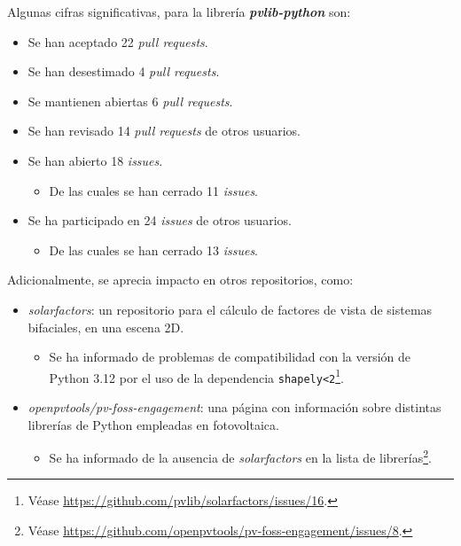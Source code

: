 Algunas cifras significativas, para la librería \textbf{\textit{pvlib-python}} son:

\begin{itemize}
    \item Se han aceptado 22 \textit{pull requests}.
    \item Se han desestimado 4 \textit{pull requests}.
    \item Se mantienen abiertas 6 \textit{pull requests}.
    \item Se han revisado 14 \textit{pull requests} de otros usuarios.
    \item Se han abierto 18 \textit{issues}.
    \begin{itemize}
        \item De las cuales se han cerrado 11 \textit{issues}.
    \end{itemize}
    \item Se ha participado en 24 \textit{issues} de otros usuarios.
    \begin{itemize}
        \item De las cuales se han cerrado 13 \textit{issues}.
    \end{itemize}
\end{itemize}

Adicionalmente, se aprecia impacto en otros repositorios, como:

\begin{itemize}
    \item \textit{solarfactors}: un repositorio para el cálculo de factores de vista de sistemas bifaciales, en una escena 2D.
    \begin{itemize}
        \item Se ha informado de problemas de compatibilidad con la versión de Python 3.12 por el uso de la dependencia \texttt{shapely<2}\footnote{Véase \url{https://github.com/pvlib/solarfactors/issues/16}.}.
    \end{itemize}
    \item \textit{openpvtools/pv-foss-engagement}: una página con información sobre distintas librerías de Python empleadas en fotovoltaica.
    \begin{itemize}
        \item Se ha informado de la ausencia de \textit{solarfactors} en la lista de librerías\footnote{Véase \url{https://github.com/openpvtools/pv-foss-engagement/issues/8}.}.
    \end{itemize}
\end{itemize}


